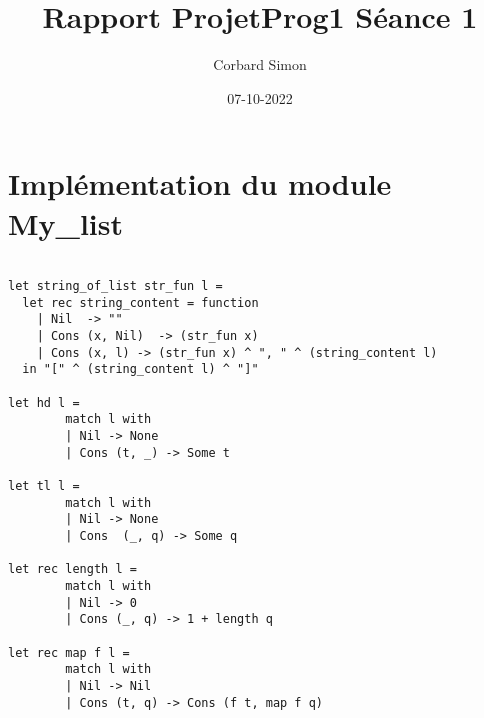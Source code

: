 \documentclass{article}
\title{Rapport ProjetProg1 Séance 1}
\author{Corbard Simon}
\date{07-10-2022}
\begin{document}
\maketitle

\section{Implémentation du module My\_list}
\begin{lstlisting}[language=caml]

let string_of_list str_fun l =
  let rec string_content = function
    | Nil  -> ""
    | Cons (x, Nil)  -> (str_fun x)
    | Cons (x, l) -> (str_fun x) ^ ", " ^ (string_content l)
  in "[" ^ (string_content l) ^ "]"

let hd l =
        match l with
        | Nil -> None
        | Cons (t, _) -> Some t

let tl l =
        match l with
        | Nil -> None
        | Cons  (_, q) -> Some q

let rec length l =
        match l with
        | Nil -> 0
        | Cons (_, q) -> 1 + length q

let rec map f l =
        match l with
        | Nil -> Nil
        | Cons (t, q) -> Cons (f t, map f q)

\end{lstlisting}
\newpage
\end{document}
